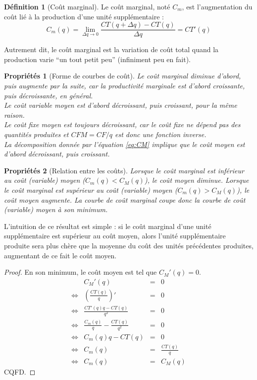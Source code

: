 \documentclass[
]{book}
\newtheorem{proposition}{Propriétés}[chapter]
\theoremstyle{definition}
\newtheorem{definition}{Définition}[chapter]
\theoremstyle{definition}
\theoremstyle{definition}
\theoremstyle{definition}
\theoremstyle{remark}
\begin{document}
\begin{definition}[Coût marginal]
Le coût marginal, noté \(C_m\), est l'augmentation du coût lié à la production d'une unité supplémentaire :
\[C_m(q)=\lim_{\Delta q\to 0}\frac{CT(q+\Delta q)-CT(q)}{\Delta q}=CT'(q)\]
\end{definition}

Autrement dit, le coût marginal est la variation de coût total quand la production varie ``un tout petit peu'' (infiniment peu en fait).

\begin{proposition}[Forme de courbes de coût]
Le coût marginal diminue d'abord, puis augmente par la suite, car la productivité marginale est d'abord croissante, puis décroissante, en général.\\
Le coût variable moyen est d'abord décroissant, puis croissant, pour la même raison.\\
Le coût fixe moyen est toujours décroissant, car le coût fixe ne dépend pas des quantités produites et \(CFM=CF/q\) est donc une fonction inverse.\\
La décomposition donnée par l'équation \eqref{eq:CM} implique que le coût moyen est d'abord décroissant, puis croissant.
\end{proposition}

\begin{proposition}[Relation entre les coûts]
Lorsque le coût marginal est inférieur au coût (variable) moyen (\(C_m(q)<C_M(q)\)), le coût moyen diminue.
Lorsque le coût marginal est supérieur au coût (variable) moyen (\(C_m(q)>C_M(q)\)), le coût moyen augmente.
La courbe de coût marginal coupe donc la courbe de coût (variable) moyen à son minimum.
\end{proposition}

L'intuition de ce résultat est simple : si le coût marginal d'une unité supplémentaire est supérieur au coût moyen, alors l'unité supplémentaire produite sera plus chère que la moyenne du coût des unités précédentes produites, augmentant de ce fait le coût moyen.

\begin{proof}
En son minimum, le coût moyen est tel que \(C_M'(q)=0\).
\[
\begin{array}{crcl}
&C_M'(q)&=&0\\
\Leftrightarrow & \left(\frac{CT(q)}{q}\right)'&=& 0\\
\Leftrightarrow & \frac{CT'(q)q-CT(q)}{q^2}&=& 0\\
\Leftrightarrow & \frac{C_m(q)}{q}-\frac{CT(q)}{q^2}&=& 0\\
\Leftrightarrow & C_m(q)q-CT(q)&=& 0\\
\Leftrightarrow & C_m(q)&=& \frac{CT(q)}{q}\\
\Leftrightarrow & C_m(q)&=& C_M(q)
\end{array}
\]
CQFD.
\end{proof}
\end{document}
